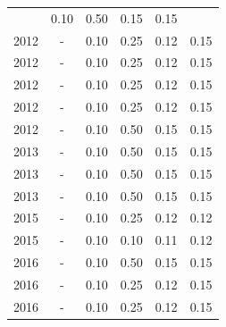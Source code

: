 \begin{table}[H]
\begin{tabular}{| l | c | c | c | c | c |}
          &
          0.10
          &
          0.50
          &
          0.15
          &
            {\color{red} 0.15}
          \\
            2012
          &
          -
          &
          0.10
          &
          0.25
          &
          0.12
          &
            {\color{red} 0.15}
          \\
            2012
          &
          -
          &
          0.10
          &
          0.25
          &
          0.12
          &
            {\color{red} 0.15}
          \\
            2012
          &
          -
          &
          0.10
          &
          0.25
          &
          0.12
          &
            {\color{red} 0.15}
          \\
            2012
          &
          -
          &
          0.10
          &
          0.25
          &
          0.12
          &
            {\color{red} 0.15}
          \\
            2012
          &
          -
          &
          0.10
          &
          0.50
          &
          0.15
          &
            {\color{red} 0.15}
          \\
\hline
            2013
          &
          -
          &
          0.10
          &
          0.50
          &
          0.15
          &
            {\color{red} 0.15}
          \\
            2013
          &
          -
          &
          0.10
          &
          0.50
          &
          0.15
          &
            {\color{red} 0.15}
          \\
            2013
          &
          -
          &
          0.10
          &
          0.50
          &
          0.15
          &
            {\color{red} 0.15}
          \\
\hline
            2015
          &
          -
          &
          0.10
          &
          0.25
          &
          0.12
          &
            {\color{red} 0.12}
          \\
            2015
          &
          -
          &
          0.10
          &
          0.10
          &
          0.11
          &
            {\color{red} 0.12}
          \\
\hline
            2016
          &
          -
          &
          0.10
          &
          0.50
          &
          0.15
          &
            {\color{red} 0.15}
          \\
            2016
          &
          -
          &
          0.10
          &
          0.25
          &
          0.12
          &
            {\color{red} 0.15}
          \\
            2016
          &
          -
          &
          0.10
          &
          0.25
          &
          0.12
          &
            {\color{red} 0.15}
          \\
\hline
\end{tabular}
\end{table}



